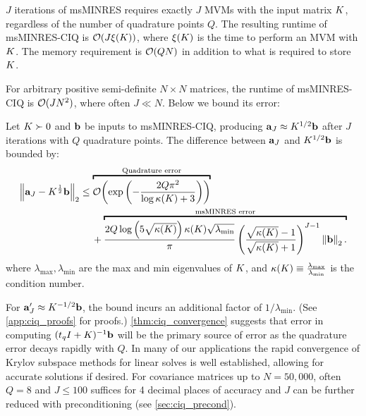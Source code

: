 \begin{property}
  $J$ iterations of msMINRES requires exactly $J$ MVMs with the input matrix $K$,
  regardless of the number of quadrature points $Q$.
  The resulting runtime of msMINRES-CIQ is $\bigo{ J \mvm{\bK}}$, where $\xi ( K )$ is the time to perform an MVM with $K$.
  The memory requirement is $\bigo{ QN }$ in addition to what is required to store $K$.
  \label{prop:msminres}
\end{property}
%
\noindent
For arbitrary positive semi-definite $N \! \times \! N$ matrices, the runtime of msMINRES-CIQ is $\bigo{J N^2}$, where often $J \ll N$.
Below we bound its error:
%
\begin{theorem}
  Let $K \succ 0$ and $\mathbf{b}$ be inputs to msMINRES-CIQ, producing $\mathbf{a}_J \approx K^{1/2} \mathbf{b}$ after $J$ iterations with $Q$ quadrature points.
  The difference between $\mathbf{a}_J$ and $K^{1/2} \mathbf{b}$ is bounded by:
  \begin{align*}
    \left\Vert \ba_J - \bK^{\frac 1 2} \bb \right\Vert_2
    &\leq
    \overbracket{
      \bigo{\exp\left( -\frac  {2 Q \pi^2}{\log \kappa(\bK) + 3} \right)}
    }^{\text{Quadrature error}}
    \\
    &\phantom{=} \:\: +
    \overbracket{
      \frac{ 2 Q \log \left( 5 \sqrt{\kappa(\bK)} \right) \kappa(\bK) \sqrt{\lambda_\text{min}} }{\pi}
      \left( \frac{ \sqrt{\kappa(\bK)} - 1}{ \sqrt{\kappa(\bK)} + 1} \right)^{J-1}
      \left\Vert \bb \right\Vert_2.
    }^{\text{msMINRES error}}
  \end{align*}
  where $\lambda_\text{max},\lambda_{\text{min}}$ are the max and min eigenvalues of $K$, and $\kappa(K) \equiv \tfrac{\lambda_\text{max}}{\lambda_\text{min}}$ is the condition number.
  \label{thm:ciq_convergence}
\end{theorem}
%
\noindent
For $\mathbf{a}'_J \approx K^{-1/2} \mathbf{b}$, the bound incurs an additional factor of $1/\lambda_\text{min}$.
(See \cref{app:ciq_proofs} for proofs.)
\cref{thm:ciq_convergence} suggests that error in computing $(t_q I + K)^{-1}\mathbf{b}$  will be the primary source of error as the quadrature error decays rapidly with $Q$. In many of our applications the rapid convergence of Krylov subspace methods for linear solves is well established, allowing for accurate solutions if desired.
For covariance matrices up to $N=50,\!000$, often $Q=8$ and $J\leq100$ suffices for 4 decimal places of accuracy and $J$ can be further reduced with preconditioning (see \cref{sec:ciq_precond}).



